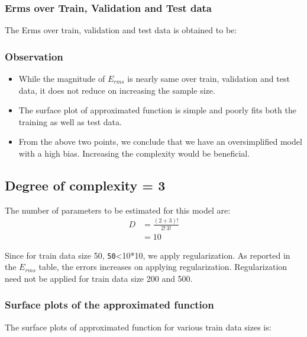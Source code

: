\documentclass[12pt,a4paper]{article}
\newcommand{\noi}{\noindent}
\def\tt#1{\texttt{#1}}
\begin{document}
\noi

\subsubsection{Erms over Train, Validation and Test data}
The Erms over train, validation and test data is obtained to be: 


\subsubsection{Observation}
\begin{itemize}
    \itemsep0em
    \item While the magnitude of $E_{rms}$ is nearly same over train, validation and test data, it does not reduce on increasing the sample size. 
    \item The surface plot of approximated function is simple and poorly fits both the training as well as test data.
    \item From the above two points, we conclude that we have an oversimplified model with a high bias. Increasing the complexity would be beneficial.
\end{itemize}

\subsection{Degree of complexity = 3}
The number of parameters to be estimated for this model are: 
\begin{equation}
    \begin{split}
        D&=\frac{(2+3)!}{2!\,3!} \\
         &=10
    \end{split}
\end{equation}
\noi
 
Since for train data size 50, \tt{50}<10*10, we apply regularization. As reported in the $E_{rms}$ table, the errors increases on applying regularization. Regularization need not be applied for train data size 200 and 500. 

\subsubsection{Surface plots of the approximated function}
The surface plots of approximated function for various train data sizes is: 
\end{document}
